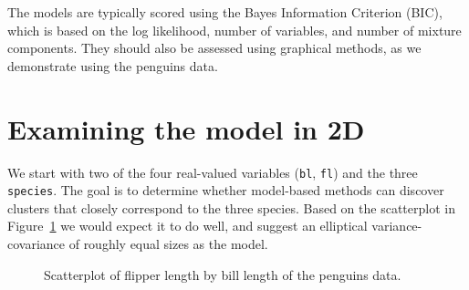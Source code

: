 \documentclass[
  letterpaper,
]{krantz}
\begin{document}

The models are typically scored using the Bayes Information Criterion
(BIC), which is based on the log likelihood, number of variables, and
number of mixture components. They should also be assessed using
graphical methods, as we demonstrate using the penguins data.

\section{Examining the model in 2D}\label{examining-the-model-in-2d}

We start with two of the four real-valued variables (\texttt{bl},
\texttt{fl}) and the three \texttt{species}. The goal is to determine
whether model-based methods can discover clusters that closely
correspond to the three species. Based on the scatterplot in
Figure~\ref{fig-penguins-bl-fl} we would expect it to do well, and
suggest an elliptical variance-covariance of roughly equal sizes as the
model.

\begin{figure}


\caption{\label{fig-penguins-bl-fl}Scatterplot of flipper length by bill
length of the penguins data.}

\end{figure}%
\end{document}
